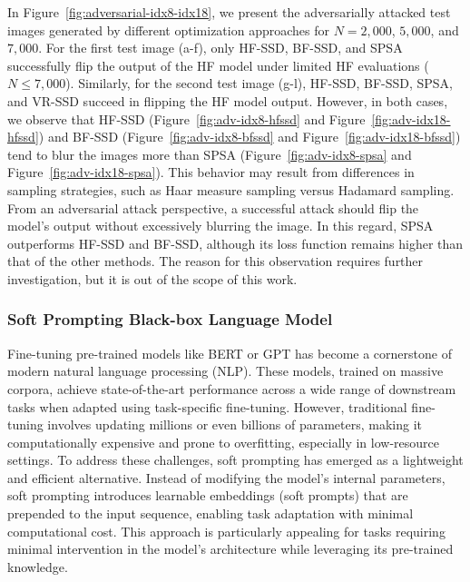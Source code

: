 \documentclass[10pt]{article} %
\numberwithin{equation}{section}
\theoremstyle{plain}
\theoremstyle{definition}
\newcommand{\<}{\langle}
\renewcommand{\>}{\rangle}
\renewcommand{\(}{\left(}
\renewcommand{\)}{\right)}
\renewcommand{\[}{\left[}
\renewcommand{\]}{\right]}
\begin{document}
In Figure~\ref{fig:adversarial-idx8-idx18}, we present the adversarially attacked test images generated by different optimization approaches for $N = 2,\!000$, $5,\!000$, and $7,\!000$. For the first test image (a-f), only HF-SSD, BF-SSD, and SPSA successfully flip the output of the HF model under limited HF evaluations ($N\leq 7,\!000$). Similarly, for the second test image (g-l), HF-SSD, BF-SSD, SPSA, and VR-SSD succeed in flipping the HF model output. However, in both cases, we observe that HF-SSD (Figure~\ref{fig:adv-idx8-hfssd} and Figure~\ref{fig:adv-idx18-hfssd}) and BF-SSD (Figure~\ref{fig:adv-idx8-bfssd} and Figure~\ref{fig:adv-idx18-bfssd}) tend to blur the images more than SPSA (Figure~\ref{fig:adv-idx8-spsa} and Figure~\ref{fig:adv-idx18-spsa}). This behavior may result from differences in sampling strategies, such as Haar measure sampling versus Hadamard sampling. From an adversarial attack perspective, a successful attack should flip the model's output without excessively blurring the image. In this regard, SPSA outperforms HF-SSD and BF-SSD, although its loss function remains higher than that of the other methods. The reason for this observation requires further investigation, but it is out of the scope of this work.

\subsubsection{Soft Prompting Black-box Language Model}
\label{ssec:tuning}

Fine-tuning pre-trained models like BERT or GPT has become a cornerstone of modern natural language processing (NLP). These models, trained on massive corpora, achieve state-of-the-art performance across a wide range of downstream tasks when adapted using task-specific fine-tuning. However, traditional fine-tuning involves updating millions or even billions of parameters, making it computationally expensive and prone to overfitting, especially in low-resource settings. To address these challenges, soft prompting has emerged as a lightweight and efficient alternative. Instead of modifying the model’s internal parameters, soft prompting introduces learnable embeddings (soft prompts) that are prepended to the input sequence, enabling task adaptation with minimal computational cost. This approach is particularly appealing for tasks requiring minimal intervention in the model's architecture while leveraging its pre-trained knowledge.
\end{document}
